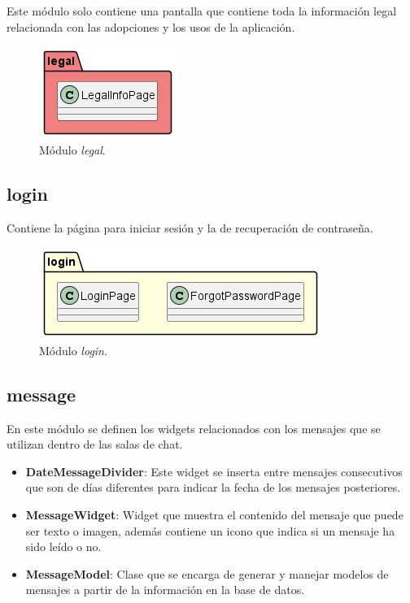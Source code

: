 \documentclass[a4paper, 12pt]{article}
\begin{document}
Este módulo solo contiene una pantalla que contiene toda la información legal relacionada con las adopciones y los usos de la aplicación.

\begin{figure}[H]
	\begin{center}
		{\includegraphics[]{diagram/Legal.png}\par}
		\caption{Módulo  \textit{legal}.}
	\end{center}
\end{figure}


\subsection*{login}


Contiene la página para iniciar sesión y la de recuperación de contraseña.

\begin{figure}[H]
	\begin{center}
		{\includegraphics[width=0.8\linewidth]{diagram/Login.png}\par}
		\caption{Módulo  \textit{login}.}
	\end{center}
\end{figure}


\subsection*{message}

En este módulo se definen los widgets relacionados con los mensajes que se utilizan dentro de las salas de chat.

\begin{itemize}[noitemsep]
	\item \textbf{DateMessageDivider}: Este widget se inserta entre mensajes consecutivos que son de días diferentes para indicar la fecha de los mensajes posteriores.
	\item \textbf{MessageWidget}: Widget que muestra el contenido del mensaje que puede ser texto o imagen, además contiene un icono que indica si un mensaje ha sido leído o no.
	\item \textbf{MessageModel}: Clase que se encarga de generar y manejar modelos de mensajes a partir de la información en la base de datos.
\end{itemize}
\end{document}
